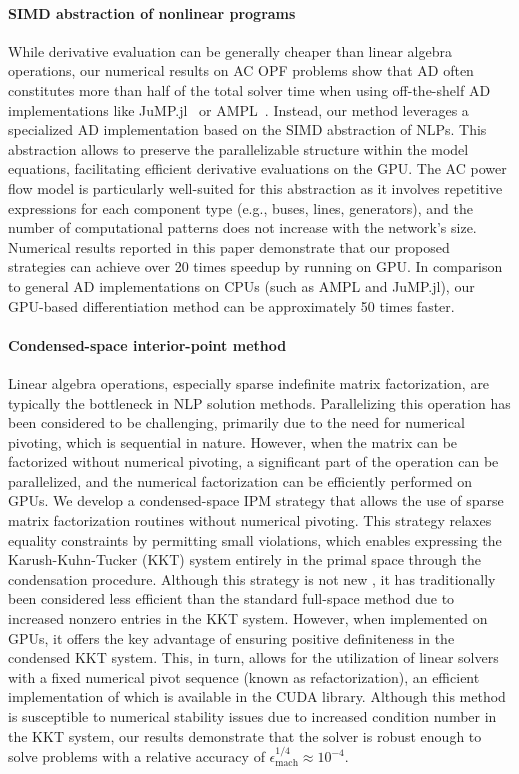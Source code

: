 \paragraph*{SIMD abstraction of nonlinear programs}
While derivative evaluation can be generally cheaper than linear
algebra operations, our numerical results on AC OPF problems
show that AD often constitutes more than half of the total solver time when using
off-the-shelf AD implementations like JuMP.jl~\cite{dunning2017jump} or AMPL~\cite{fourer1990modeling}. Instead,
our method leverages a specialized AD
implementation based on the SIMD abstraction of NLPs. This abstraction
allows to preserve the parallelizable structure within the model
equations, facilitating efficient derivative evaluations on the
GPU. The AC power flow model is particularly well-suited for this
abstraction as it involves repetitive expressions for each component
type (e.g., buses, lines, generators), and the number of computational
patterns does not increase with the network's size. Numerical results
reported in this paper demonstrate that our proposed strategies can
achieve over 20 times speedup by running on GPU. In comparison to
general AD implementations on CPUs (such as AMPL and JuMP.jl), our
GPU-based  differentiation method can be approximately 50 times faster.

\paragraph*{Condensed-space interior-point method}
Linear algebra operations, especially sparse indefinite matrix
factorization, are typically the bottleneck in NLP solution methods.
Parallelizing this operation has been considered to be challenging,
primarily due to the need for numerical pivoting, which is sequential
in nature. However, when the matrix can be factorized without
numerical pivoting, a significant part of the operation can be
parallelized, and the numerical factorization can be efficiently
performed on GPUs. We develop a condensed-space IPM strategy that
allows the use of sparse matrix factorization routines without
numerical pivoting. This strategy relaxes equality constraints by
permitting small violations, which enables expressing the
Karush-Kuhn-Tucker (KKT) system entirely in the primal space through
the condensation procedure. Although this strategy is not new
\cite{nocedal2006numerical}, it has traditionally been considered less
efficient than the standard full-space method due to increased nonzero
entries in the KKT system. However, when implemented on GPUs, it
offers the key advantage of ensuring positive definiteness in the
condensed KKT system. This, in turn, allows for the utilization
of linear solvers with a fixed numerical pivot sequence (known as
refactorization), an efficient implementation of which is available in the CUDA library.
Although this method is susceptible to numerical stability issues due to
increased condition number in the KKT system, our results demonstrate
that the solver is robust enough to solve problems with a relative
accuracy of $\epsilon_{\text{mach}}^{1/4}\approx 10^{-4}$.

